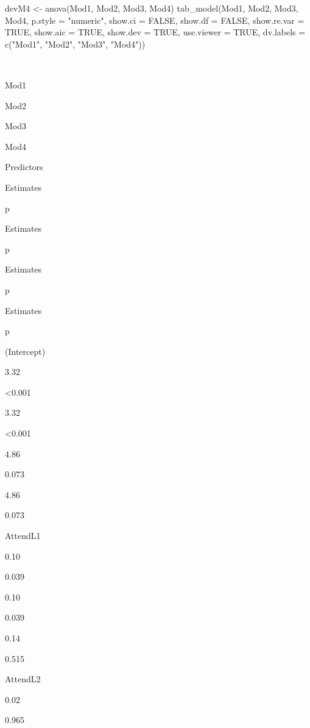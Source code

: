 \documentclass[
  11pt,
]{book}
\newenvironment{Shaded}{\begin{snugshade}}{\end{snugshade}}
\newcommand{\AttributeTok}[1]{\textcolor[rgb]{0.77,0.63,0.00}{#1}}
\newcommand{\ConstantTok}[1]{\textcolor[rgb]{0.00,0.00,0.00}{#1}}
\newcommand{\FunctionTok}[1]{\textcolor[rgb]{0.00,0.00,0.00}{#1}}
\newcommand{\NormalTok}[1]{#1}
\newcommand{\OtherTok}[1]{\textcolor[rgb]{0.56,0.35,0.01}{#1}}
\newcommand{\StringTok}[1]{\textcolor[rgb]{0.31,0.60,0.02}{#1}}
\begin{document}
\begin{Shaded}
\begin{Highlighting}[]
\NormalTok{devM4 }\OtherTok{\textless{}{-}} \FunctionTok{anova}\NormalTok{(Mod1, Mod2, Mod3, Mod4) }
\FunctionTok{tab\_model}\NormalTok{(Mod1, Mod2, Mod3, Mod4, }\AttributeTok{p.style =} \StringTok{"numeric"}\NormalTok{, }\AttributeTok{show.ci =} \ConstantTok{FALSE}\NormalTok{, }\AttributeTok{show.df =} \ConstantTok{FALSE}\NormalTok{, }\AttributeTok{show.re.var =} \ConstantTok{TRUE}\NormalTok{, }\AttributeTok{show.aic =} \ConstantTok{TRUE}\NormalTok{, }\AttributeTok{show.dev =} \ConstantTok{TRUE}\NormalTok{, }\AttributeTok{use.viewer =} \ConstantTok{TRUE}\NormalTok{, }\AttributeTok{dv.labels =} \FunctionTok{c}\NormalTok{(}\StringTok{"Mod1"}\NormalTok{, }\StringTok{"Mod2"}\NormalTok{, }\StringTok{"Mod3"}\NormalTok{, }\StringTok{"Mod4"}\NormalTok{))}
\end{Highlighting}
\end{Shaded}

~

Mod1

Mod2

Mod3

Mod4

Predictors

Estimates

p

Estimates

p

Estimates

p

Estimates

p

(Intercept)

3.32

\textless0.001

3.32

\textless0.001

4.86

0.073

4.86

0.073

AttendL1

0.10

0.039

0.10

0.039

0.14

0.515

AttendL2

0.02

0.965
\end{document}
